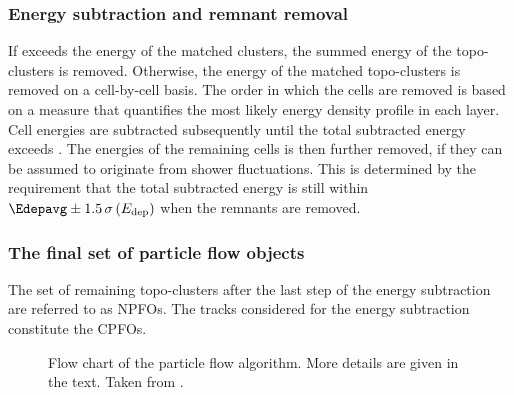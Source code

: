 \subsubsection{Energy subtraction and remnant removal} If \Edepavg exceeds the energy of the matched clusters, the summed energy of the topo-clusters is removed. Otherwise, the energy of the matched topo-clusters is removed on a cell-by-cell basis. The order in which the cells are removed is based on a measure that quantifies the most likely energy density profile in each layer. Cell energies are subtracted subsequently until the total subtracted energy exceeds \Edepavg. The energies of the remaining cells is then further removed, if they can be assumed to originate from shower fluctuations. This is determined by the requirement that the total subtracted energy is still within $\Edepavg \pm 1.5\,\sigma \left(E_{\text{dep}}\right)$ when the remnants are removed.

\subsubsection{The final set of particle flow objects}
The set of remaining topo-clusters after the last step of the energy subtraction are referred to as NPFOs. 
The tracks considered for the energy subtraction constitute the CPFOs.

\FloatBarrier
\begin{figure}[t]
    \caption{Flow chart of the particle flow algorithm. More details are given in the text. Taken from .}
    \label{fig:pflow-algorithm}
\end{figure}

